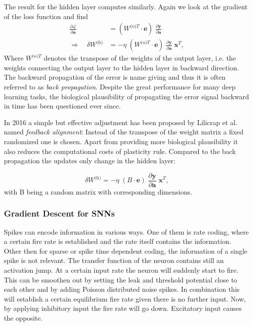 The result for the hidden layer computes similarly. Again we look at the gradient of the loss function and find
\begin{align}
\frac{\partial\mathcal{L}}{\partial \mathbf{a}} &= \left(W^{\text{(o)}T} \cdot \mathbf{e}\right) \;
\frac{\partial \mathbf{y} }{\partial \mathbf{a}}\\
\Rightarrow \quad \delta W^{\text{(h)}} &= - \eta \;
\left(W^{\text{(o)}T} \cdot \mathbf{e}\right) \;
\frac{\partial \mathbf{y} }{\partial \mathbf{a}} \;
\mathbf{x}^T,
\end{align}
Where $W^{\text{(o)}T}$ denotes the transpose of the weights of the output layer, i.e. the weights connecting the output layer to the hidden layer in backward direction. The backward propagation of the error is name giving and thus it is often referred to as \textit{back propagation}. Despite the great performance for many deep learning tasks, the biological plausibility of propagating the error signal backward in time has been questioned ever since. 

In 2016 a simple but effective adjustment has been proposed by Lilicrap et al. named \textit{feedback alignment}: Instead of the transpose of the weight matrix a fixed randomized one is chosen. Apart from providing more biological plausibility it also reduces the computational costs of plasticity rule. Compared to the back propagation the updates only change in the hidden layer:

\begin{equation}
\delta W^{\text{(h)}} = - \eta \;
(B \cdot \mathbf{e}) \;
\frac{\partial \mathbf{y}}{\partial \mathbf{a}} \;
\mathbf{x}^T,
\end{equation}
with B being a random matrix with corresponding dimensions.

\subsubsection{Gradient Descent for SNNs}

Spikes can encode information in various ways. One of them is rate coding, where a certain fire rate is established and the rate itself contains the information. Other then for sparse or spike time dependent coding, the information of a single spike is not relevant. The transfer function of the neuron contains still an activation jump. At a certain input rate the neuron will suddenly start to fire. This can be smoothen out by setting the leak and threshold potential close to each other and by adding Poisson distributed noise spikes. In combination this will establish a certain equilibrium fire rate given there is no further input. Now, by applying inhibitory input the fire rate will go down. Excitatory input causes the opposite.

